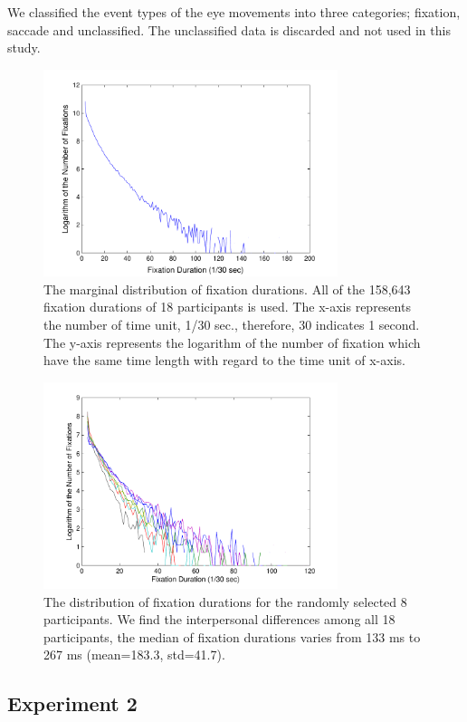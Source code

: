 \documentclass[10pt,letterpaper]{article}
\begin{document}
We classified the event types of the eye movements into three categories; fixation, saccade and unclassified. The unclassified data is discarded and not used in this study.

\begin{figure}
  \centerline{\includegraphics[width=86mm,trim=10mm 3mm 10mm 3mm]{./eps/marginal_fixation_duration.pdf}}
  \caption{The marginal distribution of fixation durations. All of the 158,643 fixation durations of 18 participants is used. The x-axis represents the number of time unit, 1/30 sec., therefore, 30 indicates 1 second. The y-axis represents the logarithm of the number of fixation which have the same time length with regard to the time unit of x-axis.}
  \label{fig:marginal-fixation-duration}
\end{figure}

\begin{figure}
  \centerline{\includegraphics[width=86mm,trim=10mm 3mm 10mm 3mm]{./eps/individual_fixation_duration.pdf}}
  \caption{The distribution of fixation durations for the randomly selected 8 participants. We find the interpersonal differences among all 18 participants, the median of fixation durations varies from 133 ms to 267 ms (mean=183.3, std=41.7).}
  \label{fig:individual-fixation-duration}
\end{figure}

\subsection{Experiment 2}
\end{document}
